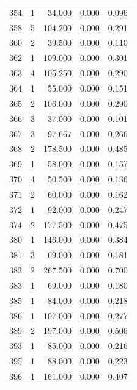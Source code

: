 \begin{table}
\begin{tabular}{rrrrr}
 354 &      1 &         34.000 &        0.000 &           0.096 \\
 358 &      5 &        104.200 &        0.000 &           0.291 \\
 360 &      2 &         39.500 &        0.000 &           0.110 \\
 362 &      1 &        109.000 &        0.000 &           0.301 \\
 363 &      4 &        105.250 &        0.000 &           0.290 \\
 364 &      1 &         55.000 &        0.000 &           0.151 \\
 365 &      2 &        106.000 &        0.000 &           0.290 \\
 366 &      3 &         37.000 &        0.000 &           0.101 \\
 367 &      3 &         97.667 &        0.000 &           0.266 \\
 368 &      2 &        178.500 &        0.000 &           0.485 \\
 369 &      1 &         58.000 &        0.000 &           0.157 \\
 370 &      4 &         50.500 &        0.000 &           0.136 \\
 371 &      2 &         60.000 &        0.000 &           0.162 \\
 372 &      1 &         92.000 &        0.000 &           0.247 \\
 374 &      2 &        177.500 &        0.000 &           0.475 \\
 380 &      1 &        146.000 &        0.000 &           0.384 \\
 381 &      3 &         69.000 &        0.000 &           0.181 \\
 382 &      2 &        267.500 &        0.000 &           0.700 \\
 383 &      1 &         69.000 &        0.000 &           0.180 \\
 385 &      1 &         84.000 &        0.000 &           0.218 \\
 386 &      1 &        107.000 &        0.000 &           0.277 \\
 389 &      2 &        197.000 &        0.000 &           0.506 \\
 393 &      1 &         85.000 &        0.000 &           0.216 \\
 395 &      1 &         88.000 &        0.000 &           0.223 \\
 396 &      1 &        161.000 &        0.000 &           0.407 \\

\end{tabular}
\end{table}
